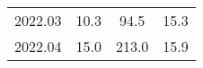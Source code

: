 \begin{table}[htb]
\begin{center}
{\begin{tabular}{cccc}
          2022.03 & 10.3                                                                    & 94.5                                                                 & 15.3                                                                                     \\
          2022.04 & 15.0                                                                    & 213.0                                                                & 15.9                                                                                     \\ \hline
        \end{tabular}
      }
    \end{center}
\end{table}